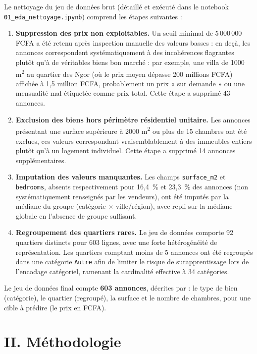 Le nettoyage du jeu de données brut (détaillé et exécuté dans le notebook
\texttt{01\_eda\_nettoyage.ipynb}) comprend les étapes suivantes :

\begin{enumerate}
  \item \textbf{Suppression des prix non exploitables.} Un seuil minimal de 5\,000\,000 FCFA a
  été retenu après inspection manuelle des valeurs basses : en deçà, les annonces correspondent
  systématiquement à des incohérences flagrantes plutôt qu'à de véritables biens bon marché : par
  exemple, une villa de 1000 m\textsuperscript{2} au quartier des Ngor (où le prix moyen dépasse
  200 millions FCFA) affichée à 1,5 million FCFA, probablement un prix « sur demande » ou une
  mensualité mal étiquetée comme prix total. Cette étape a supprimé 43 annonces.
  \item \textbf{Exclusion des biens hors périmètre résidentiel unitaire.} Les annonces présentant
  une surface supérieure à 2000 m\textsuperscript{2} ou plus de 15 chambres ont été exclues, ces
  valeurs correspondant vraisemblablement à des immeubles entiers plutôt qu'à un logement
  individuel. Cette étape a supprimé 14 annonces supplémentaires.
  \item \textbf{Imputation des valeurs manquantes.} Les champs \texttt{surface\_m2} et
  \texttt{bedrooms}, absents respectivement pour 16{,}4~\% et 23{,}3~\% des annonces (non
  systématiquement renseignés par les vendeurs), ont été imputés par la médiane du groupe
  (catégorie $\times$ ville/région), avec repli sur la médiane globale en l'absence de groupe
  suffisant.
  \item \textbf{Regroupement des quartiers rares.} Le jeu de données comporte 92 quartiers
  distincts pour 603 lignes, avec une forte hétérogénéité de représentation. Les quartiers
  comptant moins de 5 annonces ont été regroupés dans une catégorie \texttt{Autre} afin de
  limiter le risque de surapprentissage lors de l'encodage catégoriel, ramenant la cardinalité
  effective à 34 catégories.
\end{enumerate}

Le jeu de données final compte \textbf{603 annonces}, décrites par : le type de bien
(catégorie), le quartier (regroupé), la surface et le nombre de chambres, pour une cible à
prédire (le prix en FCFA).

\section{II. Méthodologie}

